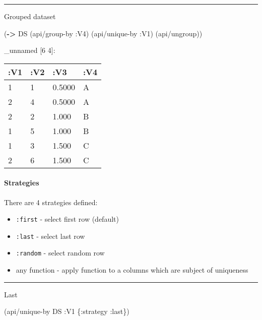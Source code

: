 \documentclass[]{article}
\newenvironment{Shaded}{\begin{snugshade}}{\end{snugshade}}
\newcommand{\KeywordTok}[1]{\textcolor[rgb]{0.13,0.29,0.53}{\textbf{#1}}}
\newcommand{\AttributeTok}[1]{\textcolor[rgb]{0.77,0.63,0.00}{#1}}
\newcommand{\NormalTok}[1]{#1}
\providecommand{\tightlist}{%
  \setlength{\itemsep}{0pt}\setlength{\parskip}{0pt}}
\let\oldparagraph\paragraph
\renewcommand{\paragraph}[1]{\oldparagraph{#1}\mbox{}}
\begin{document}
\begin{center}\rule{0.5\linewidth}{0.5pt}\end{center}

Grouped dataset

\begin{Shaded}
\begin{Highlighting}[]
\NormalTok{(}\KeywordTok{->}\NormalTok{ DS}
\NormalTok{    (api/group-by }\AttributeTok{:V4}\NormalTok{)}
\NormalTok{    (api/unique-by }\AttributeTok{:V1}\NormalTok{)}
\NormalTok{    (api/ungroup))}
\end{Highlighting}
\end{Shaded}

\_unnamed {[}6 4{]}:

\begin{longtable}[]{@{}llll@{}}
\toprule
:V1 & :V2 & :V3 & :V4\tabularnewline
\midrule
\endhead
1 & 1 & 0.5000 & A\tabularnewline
2 & 4 & 0.5000 & A\tabularnewline
2 & 2 & 1.000 & B\tabularnewline
1 & 5 & 1.000 & B\tabularnewline
1 & 3 & 1.500 & C\tabularnewline
2 & 6 & 1.500 & C\tabularnewline
\bottomrule
\end{longtable}

\paragraph{Strategies}\label{strategies}

There are 4 strategies defined:

\begin{itemize}
\tightlist
\item
  \texttt{:first} - select first row (default)
\item
  \texttt{:last} - select last row
\item
  \texttt{:random} - select random row
\item
  any function - apply function to a columns which are subject of
  uniqueness
\end{itemize}

\begin{center}\rule{0.5\linewidth}{0.5pt}\end{center}

Last

\begin{Shaded}
\begin{Highlighting}[]
\NormalTok{(api/unique-by DS }\AttributeTok{:V1}\NormalTok{ \{}\AttributeTok{:strategy} \AttributeTok{:last}\NormalTok{\})}
\end{Highlighting}
\end{Shaded}
\end{document}
